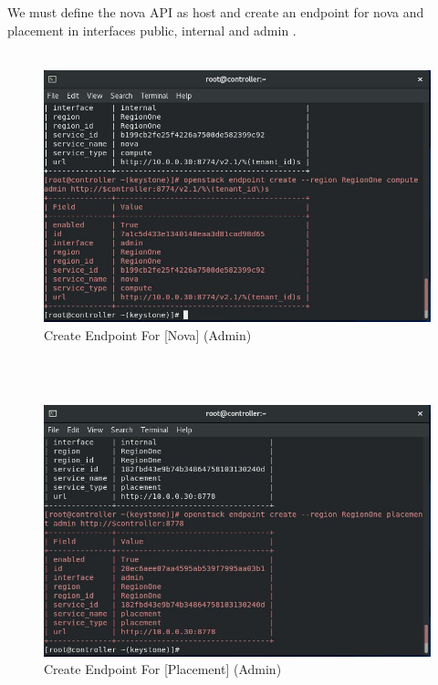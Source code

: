 \begin{spacing}{1.2}
\par We must define the nova API as host and create an endpoint for nova and placement in interfaces
public, internal and admin  .\\

\\
\begin{figure}[!htb] 
\begin{center} 
\includegraphics[width=1\linewidth]{Cloud/Nova Setup in Keystone/Create Endpoint For [Nova] (Admin)} 
\end{center} 
\caption{Create Endpoint For [Nova] (Admin)} 
\end{figure}  \FloatBarrier 
\\
\\
\begin{figure}[!htb] 
\begin{center} 
\includegraphics[width=1\linewidth]{Cloud/Nova Setup in Keystone/Create Endpoint For [Placement] (Admin)} 
\end{center} 
\caption{Create Endpoint For [Placement] (Admin)} 
\end{figure}  \FloatBarrier 
\\

\end{spacing}
